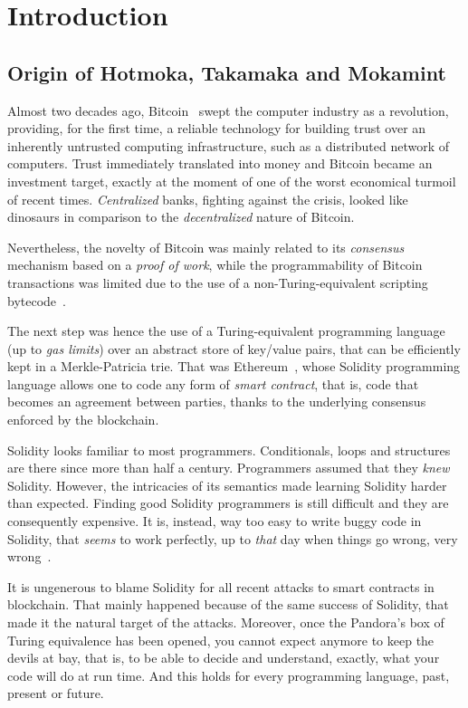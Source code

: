 \chapter{Introduction}\label{ch:introduction}

\section{Origin of Hotmoka, Takamaka and Mokamint}

Almost two decades ago, Bitcoin~\cite{Nakamoto08}
swept the computer industry
as a revolution, providing, for the first time, a reliable technology
for building trust over an inherently untrusted computing
infrastructure, such as a distributed network of computers.
Trust immediately translated into money and Bitcoin became
an investment target, exactly at the moment of one of the worst
economical turmoil of recent times. \emph{Centralized} banks,
fighting against the crisis, looked like dinosaurs in comparison
to the \emph{decentralized} nature of Bitcoin.

Nevertheless, the novelty of Bitcoin was mainly related to its
\emph{consensus} mechanism based on a
\emph{proof of work}, while the
programmability of Bitcoin transactions was limited due
to the use of a non-Turing-equivalent scripting
bytecode~\cite{Antonopoulos23}.

The next step was hence the use of a Turing-equivalent
programming language (up to \emph{gas limits}) over an abstract
store of key/value pairs, that can be
efficiently kept in a Merkle-Patricia trie.
That was Ethereum~\cite{AntonopoulosWPMP25}, whose
Solidity programming language allows one
to code any form of \emph{smart contract}, that is, code
that becomes an agreement between parties, thanks to
the underlying consensus enforced by the blockchain.

Solidity looks familiar to most programmers. Conditionals, loops and
structures are there since more than half a century. Programmers
assumed that they \emph{knew} Solidity. However, the intricacies of
its semantics made learning Solidity harder than expected.
Finding good Solidity programmers is still difficult and
they are consequently expensive. It is, instead, way too easy
to write buggy code in Solidity, that \emph{seems} to work perfectly,
up to \emph{that} day when things go wrong, very
wrong~\cite{AtzeiBC17}.

It is ungenerous to blame Solidity for all recent attacks to smart contracts
in blockchain. That mainly happened because of the same success of Solidity,
that made it the natural target of the attacks. Moreover, once the
Pandora's box of Turing equivalence has been opened, you cannot expect anymore to
keep the devils at bay, that is, to be able to
decide and understand, exactly, what your code will do at run time.
And this holds for every programming language, past, present or future.

